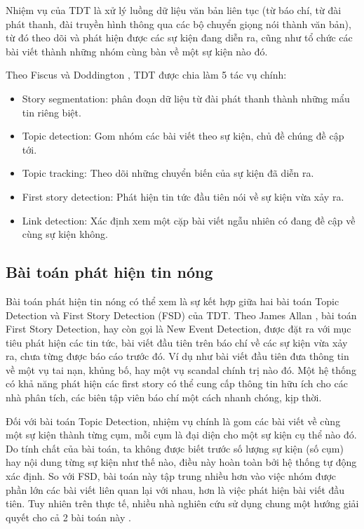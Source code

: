 	Nhiệm vụ của TDT là xử lý luồng dữ liệu văn bản liên tục (từ báo chí, từ đài phát thanh, đài truyền hình thông qua các bộ chuyển giọng nói thành văn bản), từ đó theo dõi và phát hiện được các sự kiện đang diễn ra, cũng như tổ chức các bài viết thành những nhóm cùng bàn về một sự kiện nào đó.
	
	Theo Fiscus và Doddington \cite{Fiscus:TDTDefinition}, TDT được chia làm 5 tác vụ chính: 
		\begin{itemize}
			\item Story segmentation: phân đoạn dữ liệu từ đài phát thanh thành những mẩu tin riêng biệt.
			\item Topic detection: Gom nhóm các bài viết theo sự kiện, chủ đề chúng đề cập tới.
			\item Topic tracking: Theo dõi những chuyển biến của sự kiện đã diễn ra.
			\item First story detection: Phát hiện tin tức đầu tiên nói về sự kiện vừa xảy ra.
			\item Link detection: Xác định xem một cặp bài viết ngẫu nhiên có đang đề cập về cùng sự kiện không.
		\end{itemize}

	\subsection{Bài toán phát hiện tin nóng}
	Bài toán phát hiện tin nóng có thể xem là sự kết hợp giữa hai bài toán Topic Detection và First Story Detection (FSD) của TDT. Theo James Allan \cite{Allan:2002:ITD:772260.772262}, bài toán First Story Detection, hay còn gọi là New Event Detection, được đặt ra với mục tiêu phát hiện các tin tức, bài viết đầu tiên trên báo chí về các sự kiện vừa xảy ra, chưa từng được báo cáo trước đó. Ví dụ như bài viết đầu tiên đưa thông tin về một vụ tai nạn, khủng bố, hay một vụ scandal chính trị nào đó. Một hệ thống có khả năng phát hiện các first story có thể cung cấp thông tin hữu ích cho các nhà phân tích, các biên tập viên báo chí một cách nhanh chóng, kịp thời.
	
	Đối với bài toán Topic Detection, nhiệm vụ chính là gom các bài viết về cùng một sự kiện thành từng cụm, mỗi cụm là đại diện cho một sự kiện cụ thể nào đó. Do tính chất của bài toán, ta không được biết trước số lượng sự kiện (số cụm) hay nội dung từng sự kiện như thế nào, điều này hoàn toàn bởi hệ thống tự động xác định. So với FSD, bài toán này tập trung nhiều hơn vào việc nhóm được phần lớn các bài viết liên quan lại với nhau, hơn là việc phát hiện bài viết đầu tiên. Tuy nhiên trên thực tế, nhiều nhà nghiên cứu sử dụng chung một hướng giải quyết cho cả 2 bài toán này \cite{Allan:2002:ITD:772260.772262}.
	
